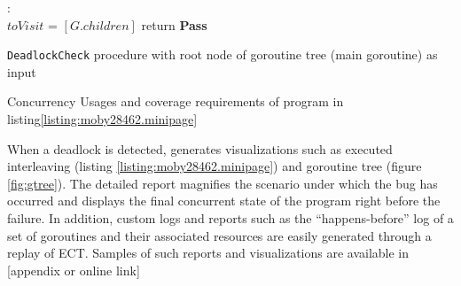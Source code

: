 \begin{small}
\begin{algorithm}[b]
 \DontPrintSemicolon
 :{\\
 \Indp
    $toVisit$ = $[G.children]$\;
      return \textbf{Pass}\;
  }
 \caption{\texttt{DeadlockCheck} procedure with root node of goroutine tree (main goroutine) as input}
 \label{proc:deadlockCheck}
\end{algorithm}
\end{small}


\begin{table}[t]
\centering
\caption{Concurrency Usages and coverage requirements of program in listing\ref{listing:moby28462.minipage}}
\scalebox{0.9}{

}
\label{tab:moby_cov_table}
\end{table}


When a deadlock is detected, \goat generates visualizations such as executed interleaving (listing \ref{listing:moby28462.minipage}) and goroutine tree (figure \ref{fig:gtree}).
%
The detailed report magnifies the scenario under which the bug has occurred and displays the final concurrent state of the program right before the failure.
%
In addition, custom logs and reports such as the ``happens-before'' log of a set of goroutines and their associated resources are easily generated through a replay of ECT.
%
Samples of such reports and visualizations are available in [appendix or online link]

